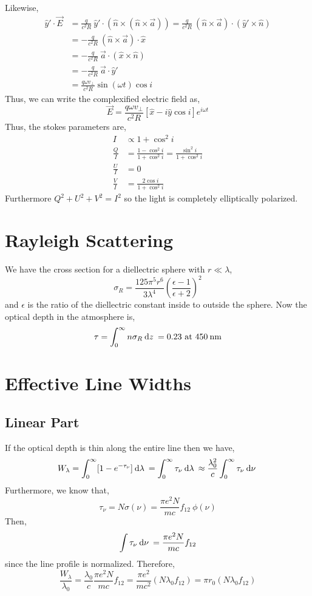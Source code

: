 \documentclass[11pt, a4paper]{article}
\begin{document}
Likewise,
\begin{align*}
\hat{y}' \cdot \vec{E} & = \frac{q}{c^2 R} \: \hat{y}' \cdot (\hat{n} \times (\hat{n} \times \vec{a})) = \frac{q}{c^2 R} \: (\hat{n} \times \vec{a}) \cdot (\hat{y}' \times \hat{n})
\\
& = - \frac{q}{c^2 R} \: (\hat{n} \times \vec{a}) \cdot \hat{x}
\\
& = - \frac{q}{c^2 R} \: \vec{a} \cdot (\hat{x} \times \hat{n})
\\
& = - \frac{q}{c^2 R} \: \vec{a} \cdot \hat{y}'
\\
& = \frac{q \omega v_\perp}{c^2 R} \sin{(\omega t)} \cos{i}
\end{align*}
Thus, we can write the complexified electric field as,
\[ \vec{E} = \frac{q \omega v_\perp}{c^2 R} [ \hat{x}  - i \hat{y} \cos{i} ] e^{i \omega t} \]
Thus, the stokes parameters are,
\begin{align*}
I & \propto 1 + \cos^2{i}
\\
\frac{Q}{I} & = \frac{1 - \cos^2{i}}{1 + \cos^2{i}} = \frac{\sin^2{i}}{1 + \cos^2{i}}
\\
\frac{U}{I} & = 0 
\\
\frac{V}{I} & = \frac{2 \cos{i}}{1 + \cos^2{i}}
\end{align*}
Furthermore $Q^2 + U^2 + V^2 = I^2$ so the light is completely elliptically polarized. 

\section{Rayleigh Scattering}

We have the cross section for a diellectric sphere with $r \ll \lambda$,
\[ \sigma_R = \frac{125 \pi^5 r^6}{3 \lambda^4} \left( \frac{\epsilon - 1}{\epsilon + 2} \right)^2 \]
and $\epsilon$ is the ratio of the diellectric constant inside to outside the sphere. Now the optical depth in the atmosphere is,
\[ \tau = \int_0^\infty n \sigma_R \: \mathrm{d}z \: = 0.23 \text{ at } 450 \: \text{nm} \]


\section{Effective Line Widths}

\subsection{Linear Part}

If the optical depth is thin along the entire line then we have,
\[ W_\lambda = \int_0^\infty [1 - e^{-\tau_\nu}] \: \mathrm{d}\lambda \: = \int_0^{\infty} \tau_\nu \: \mathrm{d}\lambda \: \approx \frac{\lambda_0^2}{c} \int_0^\infty \tau_\nu \: \mathrm{d}\nu \: \]
Furthermore, we know that,
\[ \tau_\nu = N \sigma(\nu) = \frac{\pi e^2 N}{mc} f_{12} \: \phi(\nu) \]
Then,
\[ \int \tau_\nu \: \mathrm{d}\nu \: = \frac{\pi e^2 N}{mc} f_{12} \]
since the line profile is normalized. Therefore,
\[ \frac{W_\lambda}{\lambda_0} = \frac{\lambda_0}{c} \frac{\pi e^2 N}{mc} f_{12} = \frac{\pi e^2}{m c^2} (N \lambda_0 f_{12}) = \pi r_0 (N \lambda_0 f_{12})  \]
\end{document}
